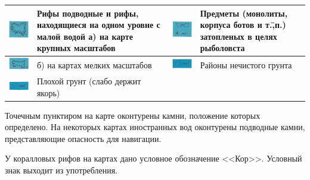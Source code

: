 \documentclass[a4paper, 12pt, twoside, final, book, russian, fittopage, cyremdash]{ncc}
\begin{document}
\begin{longtable}{M|m{0.2\textwidth}|M|m{0.2\textwidth}}
  \includegraphics[scale=1.3]{APP-2-A-7} & Рифы подводные и рифы, находящиеся на одном уровне с малой водой \newline а) на карте крупных масштабов &
  \includegraphics[scale=1.3]{APP-2-A-15} & Предметы (монолиты, корпуса ботов и т.\=,п.) затопленых в целях рыболовста \\
  \midrule
  \includegraphics[scale=1.3]{APP-2-A-8} & б) на картах мелких масштабов &
  \includegraphics[scale=1.3]{APP-2-A-16} & Районы нечистого грунта \\
  \midrule
  \includegraphics[scale=1.3]{APP-2-A-17} & Плохой грунт (слабо держит якорь) \\
  \bottomrule
\end{longtable}

Точечным пунктиром на карте оконтурены камни, положение которых определено. На некоторых картах иностранных вод оконтурены подводные камни, представляющие опасность для навигации.

У коралловых рифов на картах дано условное обозначение <<Кор>>. Условный знак выходит из употребления.
\end{document}

